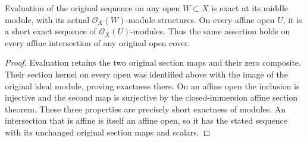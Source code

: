 \begin{corollary}
\label{cor:fibre-infinitesimal-affine-module-short-exact}
\leanok
Evaluation of the original sequence on any open $W\subset X$ is exact
at its middle module, with its actual $\mathcal O_X(W)$-module
structures. On every affine open $U$, it is a short exact sequence of
$\mathcal O_X(U)$-modules. Thus the same assertion holds on every affine
intersection of any original open cover.
\end{corollary}
\begin{proof}
Evaluation retains the two original section maps and their zero
composite. Their section kernel on every open was identified above
with the image of the original ideal module, proving exactness there.
On an affine open the inclusion is injective and the second map is
surjective by the closed-immersion affine section theorem. These three
properties are precisely short exactness of modules. An intersection
that is affine is itself an affine open, so it has the stated
sequence with its unchanged original section maps and scalars.
\end{proof}
